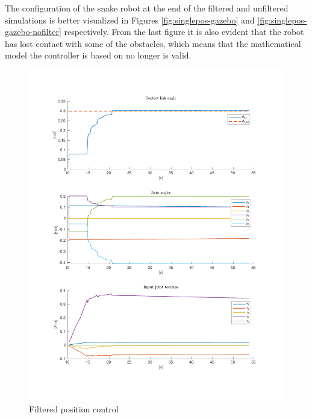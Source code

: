 The configuration of the snake robot at the end of the filtered and unfiltered simulations is better visualized in Figures \ref{fig:singlepos-gazebo} and \ref{fig:singlepos-gazebo-nofilter} respectively. From the last figure it is also evident that the robot has lost contact with some of the obstacles, which means that the mathematical model the controller is based on no longer is valid.

\begin{figure}
    \centering
    
    \includegraphics[trim=2cm 2cm 2cm 2cm, clip=true, width=\textwidth]{figures/experiments/single_pos/single-pos-3plot.pdf}

    \caption{Filtered position control}
    \label{fig:singlepos}
\end{figure}

